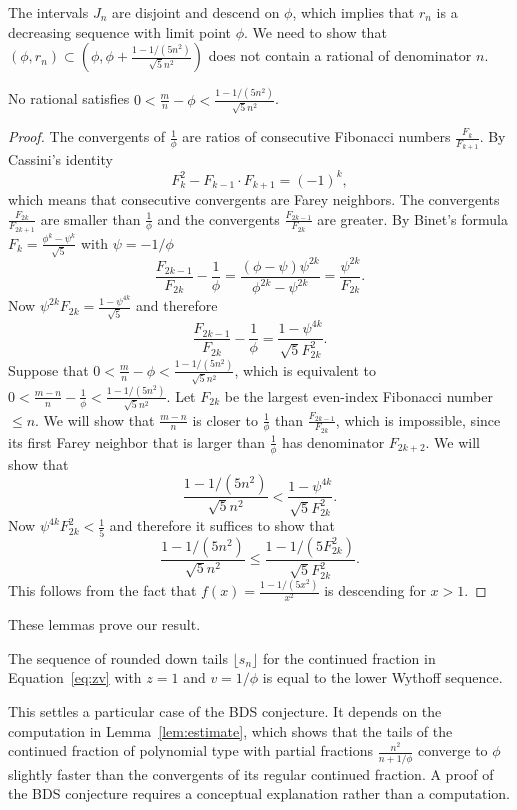 \documentclass[12pt,reqno]{article}
\begin{document}
The intervals $J_n$ are disjoint and descend on $\phi$, which implies that
$r_n$ is a decreasing sequence with limit point $\phi$. We need to show
that $(\phi,r_n)\subset (\phi,\phi+\frac{1-1/(5n^2)}{\sqrt 5 n^2})$ does not contain a rational of denominator $n$.
\begin{lemma}
    No rational satisfies $0<\frac mn-\phi<\frac{1-1/(5n^2)}{\sqrt 5 n^2}$.
\end{lemma}
\begin{proof}
    The convergents of $\frac 1\phi$ are ratios of consecutive Fibonacci
    numbers $\frac {F_{k}}{F_{k+1}}$. By Cassini's identity
    \[
    F_k^2-F_{k-1}\cdot F_{k+1}=(-1)^k,
    \]
    which means that consecutive convergents are Farey neighbors. 
    The convergents $\frac {F_{2k}}{F_{2k+1}}$ are smaller than $\frac 1\phi$ and the
    convergents $\frac {F_{2k-1}}{F_{2k}}$ are greater.
    By Binet's formula $F_k=\frac{\phi^k-\psi^k}{\sqrt 5}$ with $\psi=-1/\phi$
    \[
    \frac {F_{2k-1}}{F_{2k}}-\frac 1\phi=\frac{(\phi-\psi)\psi^{2k}}{\phi^{2k}-\psi^{2k}}=\frac{\psi^{2k}}{F_{2k}}.
    \]
    Now $\psi^{2k}F_{2k}=\frac{1-\psi^{4k}}{\sqrt 5}$ and therefore
    \[
    \frac {F_{2k-1}}{F_{2k}}-\frac 1\phi=\frac {1-\psi^{4k}}{\sqrt 5 F_{2k}^2}.
    \]
    Suppose that $0<\frac mn-\phi<\frac{1-1/(5n^2)}{\sqrt 5 n^2}$,
    which is equivalent to $0<\frac {m-n}n-\frac 1\phi<\frac{1-1/(5n^2)}{\sqrt 5 n^2}$.
    Let $F_{2k}$
    be the largest even-index Fibonacci number $\leq n$. We will show that $\frac{m-n}n$
    is closer to $\frac 1\phi$ than $\frac{F_{2k-1}}{F_{2k}}$, which is impossible,
    since its first Farey neighbor that is larger than $\frac 1\phi$ has denominator
    $F_{2k+2}$. We will show that
    \[
    \frac{1-1/(5n^2)}{\sqrt 5 n^2}<\frac{1-\psi^{4k}}{\sqrt 5 F_{2k}^2}.
    \]
    Now $\psi^{4k}F_{2k}^2<\frac 15$ and therefore it suffices to show that
    \[
    \frac{1-1/(5n^2)}{\sqrt 5 n^2}\leq\frac{1-1/(5F_{2k}^2)}{\sqrt 5 F_{2k}^2}.
    \]
    This follows from the fact that $f(x)=\frac{1-1/(5x^2)}{x^2}$ is
    descending for $x>1$.
\end{proof}
These lemmas prove our result.
\begin{theorem}
    The sequence of rounded down tails $\lfloor s_n\rfloor$ for the continued fraction
    in Equation~\ref{eq:zv} with $z=1$ and $v=1/\phi$
    is equal to the lower Wythoff sequence. 
\end{theorem}

This settles a particular case of the BDS conjecture. It depends on the computation in Lemma~\ref{lem:estimate},
which shows that the tails of the continued fraction of polynomial type with partial fractions $\frac{n^2}{n+1/\phi}$ converge
to $\phi$ slightly faster than the convergents of its regular continued fraction. A proof of the BDS
conjecture requires a conceptual explanation rather than a computation.
\end{document}
